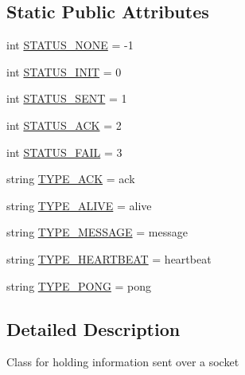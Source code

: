 \subsection*{Static Public Attributes}
\begin{DoxyCompactItemize}
\item 
int \hyperlink{classparlai_1_1mturk_1_1core_1_1socket__manager_1_1Packet_a3a49b3cfcefa0c4523109b24aa3accfc}{S\+T\+A\+T\+U\+S\+\_\+\+N\+O\+NE} = -\/1
\item 
int \hyperlink{classparlai_1_1mturk_1_1core_1_1socket__manager_1_1Packet_a207aea6e3c632492da51c294542e5e0a}{S\+T\+A\+T\+U\+S\+\_\+\+I\+N\+IT} = 0
\item 
int \hyperlink{classparlai_1_1mturk_1_1core_1_1socket__manager_1_1Packet_a06bf83640f20e3379703d6371fd07db8}{S\+T\+A\+T\+U\+S\+\_\+\+S\+E\+NT} = 1
\item 
int \hyperlink{classparlai_1_1mturk_1_1core_1_1socket__manager_1_1Packet_a7898ea8f40c5c6312391d427d683146c}{S\+T\+A\+T\+U\+S\+\_\+\+A\+CK} = 2
\item 
int \hyperlink{classparlai_1_1mturk_1_1core_1_1socket__manager_1_1Packet_a52104d84af2792d00e685f2d9b62cdc2}{S\+T\+A\+T\+U\+S\+\_\+\+F\+A\+IL} = 3
\item 
string \hyperlink{classparlai_1_1mturk_1_1core_1_1socket__manager_1_1Packet_a51fa09c6b2ff9e86cf0886f17c5c0dd7}{T\+Y\+P\+E\+\_\+\+A\+CK} = \textquotesingle{}ack\textquotesingle{}
\item 
string \hyperlink{classparlai_1_1mturk_1_1core_1_1socket__manager_1_1Packet_a67c8eb4f8011027797868709968b36ca}{T\+Y\+P\+E\+\_\+\+A\+L\+I\+VE} = \textquotesingle{}alive\textquotesingle{}
\item 
string \hyperlink{classparlai_1_1mturk_1_1core_1_1socket__manager_1_1Packet_a1eecf109d460120c3cc6ec4a238ed2d2}{T\+Y\+P\+E\+\_\+\+M\+E\+S\+S\+A\+GE} = \textquotesingle{}message\textquotesingle{}
\item 
string \hyperlink{classparlai_1_1mturk_1_1core_1_1socket__manager_1_1Packet_a05b4266ed448111e2844754fcec3dc6b}{T\+Y\+P\+E\+\_\+\+H\+E\+A\+R\+T\+B\+E\+AT} = \textquotesingle{}heartbeat\textquotesingle{}
\item 
string \hyperlink{classparlai_1_1mturk_1_1core_1_1socket__manager_1_1Packet_a330a38900fd99488002a5bc9d245ed52}{T\+Y\+P\+E\+\_\+\+P\+O\+NG} = \textquotesingle{}pong\textquotesingle{}
\end{DoxyCompactItemize}


\subsection{Detailed Description}
\begin{DoxyVerb}Class for holding information sent over a socket\end{DoxyVerb}
 

